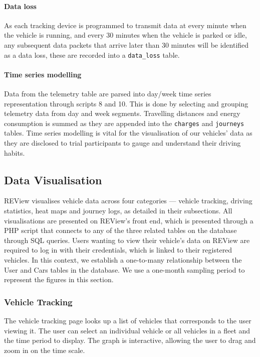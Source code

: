 \paragraph{Data loss} As each tracking device is programmed to transmit data at every minute when the vehicle is running, and every 30 minutes when the vehicle is parked or idle, any subsequent data packets that arrive later than 30 minutes will be identified as a data loss, these are recorded into a \texttt{data\_loss} table.

\paragraph{Time series modelling} Data from the telemetry table are parsed into day/week time series representation through scripts 8 and 10. This is done by selecting and grouping telemetry data from day and week segments. Travelling distances and energy consumption is summed as they are appended into the \texttt{charges} and \texttt{journeys} tables. Time series modelling is vital for the visualisation of our vehicles’ data as they are disclosed to trial participants to gauge and understand their driving habits.

\subsection{Data Visualisation}
REView visualises vehicle data across four categories --- vehicle tracking, driving statistics, heat maps and journey logs, as detailed in their subsections. All visualisations are presented on REView’s front end, which is presented through a PHP script that connects to any of the three related tables on the database through SQL queries. Users wanting to view their vehicle’s data on REView are required to log in with their credentials, which is linked to their registered vehicles. In this context, we establish a one-to-many relationship between the User and Cars tables in the database. We use a one-month sampling period to represent the figures in this section.

\subsubsection{Vehicle Tracking}
The vehicle tracking page looks up a list of vehicles that corresponds to the user viewing it. The user can select an individual vehicle or all vehicles in a fleet and the time period to display. The graph is interactive, allowing the user to drag and zoom in on the time scale. 

